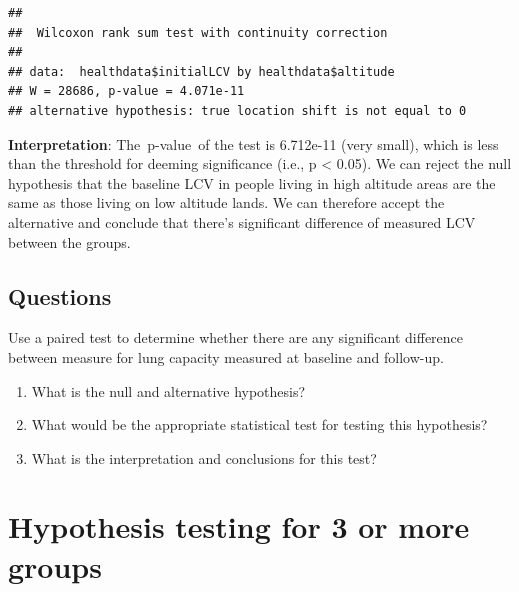 \documentclass[
]{book}
\newenvironment{Shaded}{\begin{snugshade}}{\end{snugshade}}
\newcommand{\AttributeTok}[1]{\textcolor[rgb]{0.77,0.63,0.00}{#1}}
\newcommand{\CommentTok}[1]{\textcolor[rgb]{0.56,0.35,0.01}{\textit{#1}}}
\newcommand{\ConstantTok}[1]{\textcolor[rgb]{0.00,0.00,0.00}{#1}}
\newcommand{\FunctionTok}[1]{\textcolor[rgb]{0.00,0.00,0.00}{#1}}
\newcommand{\NormalTok}[1]{#1}
\newcommand{\SpecialCharTok}[1]{\textcolor[rgb]{0.00,0.00,0.00}{#1}}
\begin{document}
\begin{Shaded}
\end{Shaded}

\begin{verbatim}
## 
##  Wilcoxon rank sum test with continuity correction
## 
## data:  healthdata$initialLCV by healthdata$altitude
## W = 28686, p-value = 4.071e-11
## alternative hypothesis: true location shift is not equal to 0
\end{verbatim}

\textbf{Interpretation}: The~p-value~of the test is 6.712e-11 (very small), which is less than the threshold for deeming significance (i.e., p \textless{} 0.05). We can reject the null hypothesis that the baseline LCV in people living in high altitude areas are the same as those living on low altitude lands. We can therefore accept the alternative and conclude that there's significant difference of measured LCV between the groups.

\hypertarget{questions-1}{%
\subsection{Questions}\label{questions-1}}

Use a paired test to determine whether there are any significant difference between measure for lung capacity measured at baseline and follow-up.

\begin{enumerate}
\def\labelenumi{\arabic{enumi}.}
\item
  What is the null and alternative hypothesis?
\item
  What would be the appropriate statistical test for testing this hypothesis?
\item
  What is the interpretation and conclusions for this test?
\end{enumerate}

\hypertarget{hypothesis-testing-for-3-or-more-groups}{%
\section{Hypothesis testing for 3 or more groups}\label{hypothesis-testing-for-3-or-more-groups}}
\end{document}

